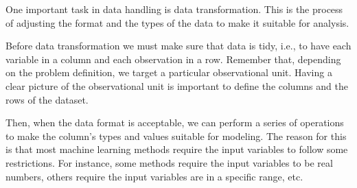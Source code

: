 One important task in data handling is data transformation.  This is the process of adjusting
the format and the types of the data to make it suitable for analysis.

Before data transformation we must make sure that data is tidy, i.e., to have
each variable in a column and each observation in a row.  Remember that, depending on the
problem definition, we target a particular observational unit.  Having a clear picture of
the observational unit is important to define the columns and the rows of the dataset.

Then, when the data format is acceptable, we can perform a series of operations to make the
column's types and values suitable for modeling.  The reason for this is that most
machine learning methods require the input variables to follow some restrictions.  For
instance, some methods require the input variables to be real numbers, others require the
input variables are in a specific range, etc.

%
%
%
%

